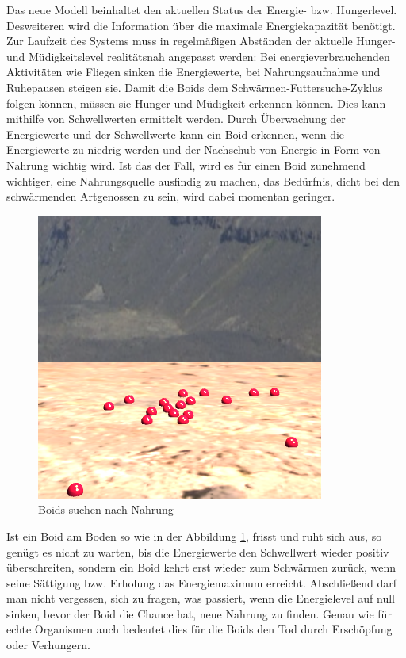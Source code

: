 \documentclass[draft=false
              ,paper=a4
              ,twoside=false
              ,fontsize=11pt
              ,headsepline
              ,BCOR10mm
              ,DIV11
              ,bibtotoc
              ,liststotoc
              ]{scrbook}
\begin{document}
Das neue Modell beinhaltet den aktuellen Status der Energie- bzw. Hungerlevel. Desweiteren wird die Information über die maximale Energiekapazität benötigt. Zur Laufzeit des Systems muss in regelmäßigen Abständen der aktuelle Hunger- und Müdigkeitslevel realitätsnah angepasst werden: Bei energieverbrauchenden Aktivitäten wie Fliegen sinken die Energiewerte, bei Nahrungsaufnahme und Ruhepausen steigen sie. Damit die Boids dem Schwärmen-Futtersuche-Zyklus folgen können, müssen sie Hunger und Müdigkeit erkennen können. Dies kann mithilfe von Schwellwerten ermittelt werden. Durch Überwachung der Energiewerte und der Schwellwerte kann ein Boid erkennen, wenn die Energiewerte zu niedrig werden und der Nachschub von Energie in Form von Nahrung wichtig wird. Ist das der Fall, wird es für einen Boid zunehmend wichtiger, eine Nahrungsquelle ausfindig zu machen, das Bedürfnis, dicht bei den schwärmenden Artgenossen zu sein, wird dabei momentan geringer.


\begin{figure}[htp]
\centering
\includegraphics[scale=0.50]{project/ground.png}
\caption{Boids suchen nach Nahrung}
\label{onground}
\end{figure}

Ist ein Boid am Boden so wie in der Abbildung \ref{onground}, frisst und ruht sich aus, so genügt es nicht zu warten, bis die Energiewerte den Schwellwert wieder positiv überschreiten, sondern ein Boid kehrt erst wieder zum Schwärmen zurück, wenn seine Sättigung bzw. Erholung das Energiemaximum erreicht.
Abschließend darf man nicht vergessen, sich zu fragen, was passiert, wenn die Energielevel auf null sinken, bevor der Boid die Chance hat, neue Nahrung zu finden. Genau wie für echte Organismen auch bedeutet dies für die Boids den Tod durch Erschöpfung oder Verhungern.
\end{document}
